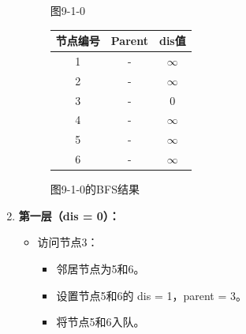\documentclass{article}
\begin{document}
\begin{enumerate}
\begin{figure}[htbp]
\begin{minipage}[b]{0.6\textwidth}
            \caption{图9-1-0}
            \label{fig:9-1-0}
        \end{minipage}%
        \hfill%
        \begin{minipage}[b]{0.4\textwidth}    %
            \centering
            \begin{tabular}{|c|c|c|}
                \hline
                节点编号 & Parent & dis值 \\
                \hline
                1 & - & $\infty$ \\
                2 & - & $\infty$ \\
                3 & - & 0 \\
                4 & - & $\infty$ \\
                5 & - & $\infty$ \\
                6 & - & $\infty$ \\
                \hline
            \end{tabular}
            \caption{图9-1-0的BFS结果}
            \label{tab:graph9-1-bfs-0}
        \end{minipage}
    \end{figure}

    \pagebreak

    \item \textbf{第一层（dis = 0）：}
    \begin{itemize}
        \item 访问节点3：
        \begin{itemize}
            \item 邻居节点为5和6。
            \item 设置节点5和6的 dis = 1，parent = 3。
            \item 将节点5和6入队。
        \end{itemize}


\end{itemize}
\end{enumerate}
\end{document}
